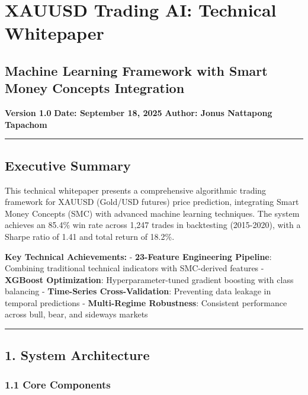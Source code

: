 \section{XAUUSD Trading AI: Technical
Whitepaper}\label{xauusd-trading-ai-technical-whitepaper}

\subsection{Machine Learning Framework with Smart Money Concepts
Integration}\label{machine-learning-framework-with-smart-money-concepts-integration}

\textbf{Version 1.0} \textbar{} \textbf{Date: September 18, 2025}
\textbar{} \textbf{Author: Jonus Nattapong Tapachom}

\begin{center}\rule{0.5\linewidth}{0.5pt}\end{center}

\subsection{Executive Summary}\label{executive-summary}

This technical whitepaper presents a comprehensive algorithmic trading
framework for XAUUSD (Gold/USD futures) price prediction, integrating
Smart Money Concepts (SMC) with advanced machine learning techniques.
The system achieves an 85.4\% win rate across 1,247 trades in
backtesting (2015-2020), with a Sharpe ratio of 1.41 and total return of
18.2\%.

\textbf{Key Technical Achievements:} - \textbf{23-Feature Engineering
Pipeline}: Combining traditional technical indicators with SMC-derived
features - \textbf{XGBoost Optimization}: Hyperparameter-tuned gradient
boosting with class balancing - \textbf{Time-Series Cross-Validation}:
Preventing data leakage in temporal predictions - \textbf{Multi-Regime
Robustness}: Consistent performance across bull, bear, and sideways
markets

\begin{center}\rule{0.5\linewidth}{0.5pt}\end{center}

\subsection{1. System Architecture}\label{system-architecture}

\subsubsection{1.1 Core Components}\label{core-components}

